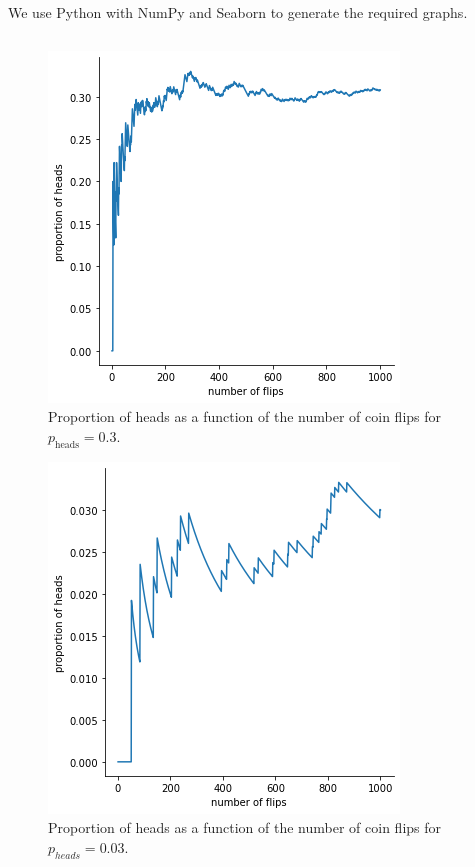 \begin{ex}
  We use Python with NumPy and Seaborn to generate the required graphs.
  \inputminted{python}{./src/01-21.py}

  \begin{figure}[H]
    \centering
    \includegraphics[scale=0.7]{part1/01-21a}
    \caption{Proportion of heads as a function of the number of coin flips for
      $p_\text{heads}=0.3$.}
  \end{figure}

  \begin{figure}[H]
    \centering
    \includegraphics[scale=0.7]{part1/01-21b}
    \caption{Proportion of heads as a function of the number of coin flips for
      $p_{heads}=0.03$.}
  \end{figure}

\end{ex}

